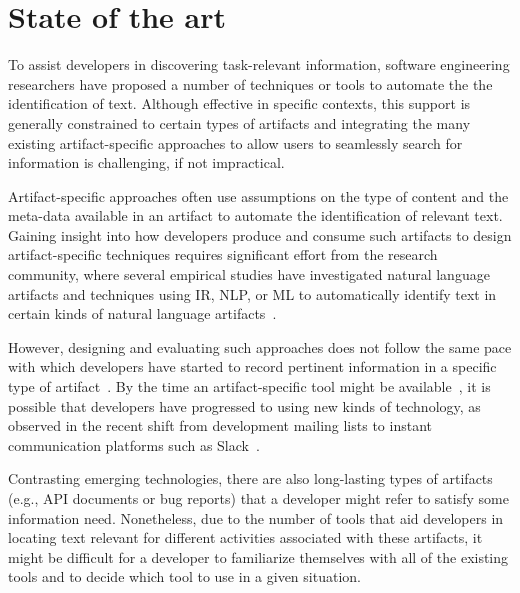 \section{State of the art}
\label{cp1:novelty}



To assist developers in discovering task-relevant information,
software engineering researchers have proposed 
a number of techniques or tools 
to automate the the identification of  text.
Although effective in specific contexts, this support is generally constrained 
to certain
types of artifacts and integrating the many existing artifact-specific
approaches to allow users to seamlessly search
for information is challenging, if not impractical. 


Artifact-specific approaches often use assumptions on the type of content 
and the meta-data available in an artifact
to automate the identification of relevant text.
Gaining insight into how developers produce and consume 
such artifacts to design artifact-specific techniques
 requires significant effort from the research community,
 where several empirical studies have investigated 
natural language artifacts 
and techniques using \acf{IR}, \acf{NLP}, or \acf{ML}  to automatically identify
text in certain kinds of natural language artifacts~\cite{panichella2012, Ko2006, Arya2019, Maalej2013}.


However, designing and evaluating such approaches
does not follow the same pace with which developers have started to 
record pertinent information in a specific type of artifact~\cite{garousi2019}.
By the time an artifact-specific tool might be available~\cite{gibbs1994},
it is possible 
that developers have progressed to using new kinds of technology,
as observed in the recent shift from 
development mailing lists to instant communication platforms such as Slack~\cite{Lin2016, Chatterjee2020}. 




Contrasting emerging technologies, 
there are also
long-lasting types of artifacts (e.g., API documents or bug reports) that a developer
might refer to satisfy some information need. 
Nonetheless, due to the number of tools 
that aid developers in locating text relevant 
for different activities associated with these artifacts, it might be difficult for a developer to familiarize themselves 
with all of the existing tools
and to decide which tool to use in a given situation.




